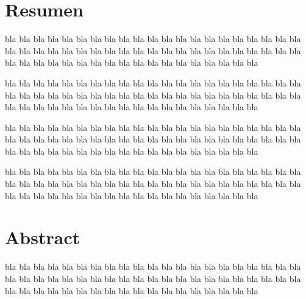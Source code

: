 \documentclass[12pt]{article}
\begin{document}



\newpage
\tableofcontents

\newpage
\listoffigures


\newpage

\newpage
\section*{\Large Resumen}
bla bla bla bla bla bla bla bla bla bla bla bla bla bla bla bla bla bla bla bla bla bla bla bla bla bla bla bla bla bla bla bla bla bla bla bla bla bla bla bla bla bla bla bla bla bla bla bla bla bla bla bla bla bla bla bla bla bla bla bla

\vspace*{0.3cm}
bla bla bla bla bla bla bla bla bla bla bla bla bla bla bla bla bla bla bla bla bla bla bla bla bla bla bla bla bla bla bla bla bla bla bla bla bla bla bla bla bla bla bla bla bla bla bla bla bla bla bla bla bla bla bla bla bla bla bla bla
 

\vspace*{0.3cm}
bla bla bla bla bla bla bla bla bla bla bla bla bla bla bla bla bla bla bla bla bla bla bla bla bla bla bla bla bla bla bla bla bla bla bla bla bla bla bla bla bla bla bla bla bla bla bla bla bla bla bla bla bla bla bla bla bla bla bla bla

bla bla bla bla bla bla bla bla bla bla bla bla bla bla bla bla bla bla bla bla bla bla bla bla bla bla bla bla bla bla bla bla bla bla bla bla bla bla bla bla bla bla bla bla bla bla bla bla bla bla bla bla bla bla bla bla bla bla bla bla




\newpage
\section*{\Large Abstract}
\vspace*{0.3cm}
bla bla bla bla bla bla bla bla bla bla bla bla bla bla bla bla bla bla bla bla bla bla bla bla bla bla bla bla bla bla bla bla bla bla bla bla bla bla bla bla bla bla bla bla bla bla bla bla bla bla bla bla bla bla bla bla bla bla bla bla
 
\end{document}
